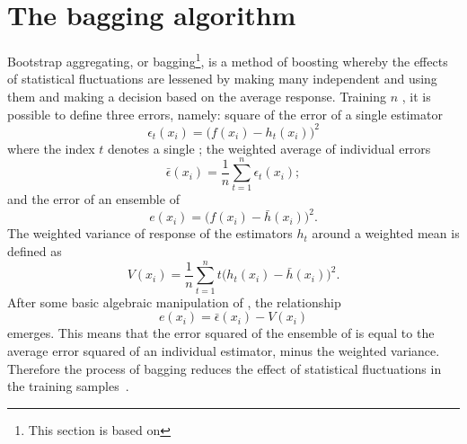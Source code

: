 \section{The bagging algorithm}
\label{sec:bdt:bag}
Bootstrap aggregating, or bagging\footnote{
  This section is based on }, is a method of boosting whereby the effects of
statistical fluctuations are lessened by making many independent \DTs and using them
and making a decision based on the average response.
Training $n$ \DTs, it is possible to define three errors, namely:
square of the error of a single estimator
\begin{equation}
  \epsilon_t(x_i) = \big(f(x_i)-h_t(x_i)\big)^2
  \label{eq:bdt:bag1}
\end{equation}
where the index $t$ denotes a single \DT;
the weighted average of individual errors
\begin{equation}
  \bar\epsilon(x_i) = \frac1n\sum_{t=1}^n\epsilon_t(x_i);
  \label{eq:bdt:bag2}
\end{equation}
and the error of an ensemble of \DTs
\begin{equation}
  e(x_i) = \big(f(x_i)-\bar h(x_i)\big)^2.
  \label{eq:bdt:bag3}
\end{equation}
The weighted variance of response of the estimators $h_t$ around a weighted mean is defined as
\begin{equation}
  V(x_i) = \frac1n\sum_{t=1}^nt\big(h_t(x_i) - \bar h(x_i)\big)^2.
  \label{eq:bdt:bag4}
\end{equation}
After some basic algebraic manipulation of , the relationship
\begin{equation}
  e(x_i) = \bar\epsilon(x_i) - V(x_i)
  \label{eq:bdt:bag5}
\end{equation}
emerges.
This means that the error squared of the ensemble of \DTs is equal to the average error squared of an
individual estimator, minus the weighted variance.
Therefore the process of bagging reduces the
effect of statistical fluctuations in the training samples~\cite{Krogh95neuralnetwork}.

